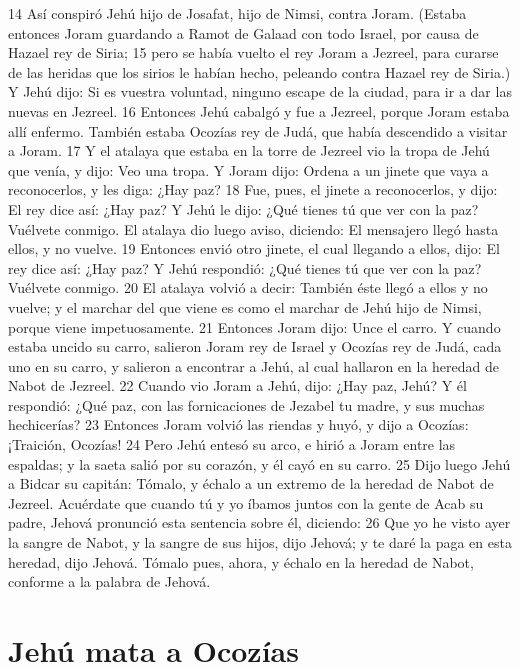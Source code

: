 14 Así conspiró Jehú hijo de Josafat, hijo de Nimsi, contra Joram. (Estaba entonces Joram guardando a Ramot de Galaad con todo Israel, por causa de Hazael rey de Siria;
15 pero se había vuelto el rey Joram a Jezreel, para curarse de las heridas que los sirios le habían hecho, peleando contra Hazael rey de Siria.) Y Jehú dijo: Si es vuestra voluntad, ninguno escape de la ciudad, para ir a dar las nuevas en Jezreel.
16 Entonces Jehú cabalgó y fue a Jezreel, porque Joram estaba allí enfermo. También estaba Ocozías rey de Judá, que había descendido a visitar a Joram.
17 Y el atalaya que estaba en la torre de Jezreel vio la tropa de Jehú que venía, y dijo: Veo una tropa. Y Joram dijo: Ordena a un jinete que vaya a reconocerlos, y les diga: ¿Hay paz?
18 Fue, pues, el jinete a reconocerlos, y dijo: El rey dice así: ¿Hay paz? Y Jehú le dijo: ¿Qué tienes tú que ver con la paz? Vuélvete conmigo. El atalaya dio luego aviso, diciendo: El mensajero llegó hasta ellos, y no vuelve.
19 Entonces envió otro jinete, el cual llegando a ellos, dijo: El rey dice así: ¿Hay paz? Y Jehú respondió: ¿Qué tienes tú que ver con la paz? Vuélvete conmigo.
20 El atalaya volvió a decir: También éste llegó a ellos y no vuelve; y el marchar del que viene es como el marchar de Jehú hijo de Nimsi, porque viene impetuosamente.
21 Entonces Joram dijo: Unce el carro. Y cuando estaba uncido su carro, salieron Joram rey de Israel y Ocozías rey de Judá, cada uno en su carro, y salieron a encontrar a Jehú, al cual hallaron en la heredad de Nabot de Jezreel.
22 Cuando vio Joram a Jehú, dijo: ¿Hay paz, Jehú? Y él respondió: ¿Qué paz, con las fornicaciones de Jezabel tu madre, y sus muchas hechicerías?
23 Entonces Joram volvió las riendas y huyó, y dijo a Ocozías: ¡Traición, Ocozías!
24 Pero Jehú entesó su arco, e hirió a Joram entre las espaldas; y la saeta salió por su corazón, y él cayó en su carro.
25 Dijo luego Jehú a Bidcar su capitán: Tómalo, y échalo a un extremo de la heredad de Nabot de Jezreel. Acuérdate que cuando tú y yo íbamos juntos con la gente de Acab su padre, Jehová pronunció esta sentencia sobre él, diciendo:
26 Que yo he visto ayer la sangre de Nabot, y la sangre de sus hijos, dijo Jehová; y te daré la paga en esta heredad, dijo Jehová. Tómalo pues, ahora, y échalo en la heredad de Nabot, conforme a la palabra de Jehová.

\section*{Jehú mata a Ocozías}


